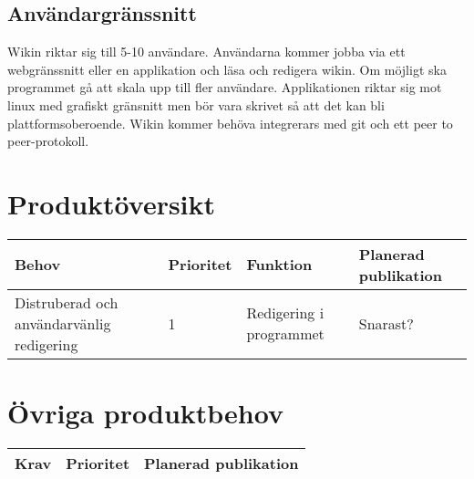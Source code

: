 \subsection{Användargränssnitt}
Wikin riktar sig till 5-10 användare. Användarna kommer jobba via ett webgränssnitt eller en applikation och läsa och redigera wikin. Om möjligt ska programmet gå att skala upp till fler användare. Applikationen riktar sig mot linux med grafiskt gränsnitt men bör vara skrivet så att det kan bli plattformsoberoende. Wikin kommer behöva integrerars med git och ett peer to peer-protokoll. 
\section{Produktöversikt}
\begin{tabular}{|l|l|l|l|}
\hline
Behov & Prioritet & Funktion & Planerad publikation \\
\hline
Distruberad och användarvänlig redigering & 1 & Redigering i programmet & Snarast? \\
\hline
\end{tabular}
\section{Övriga produktbehov}
\begin{tabular}{|l|l|l|}
\hline
Krav & Prioritet & Planerad publikation \\
\hline
\end{tabular}


